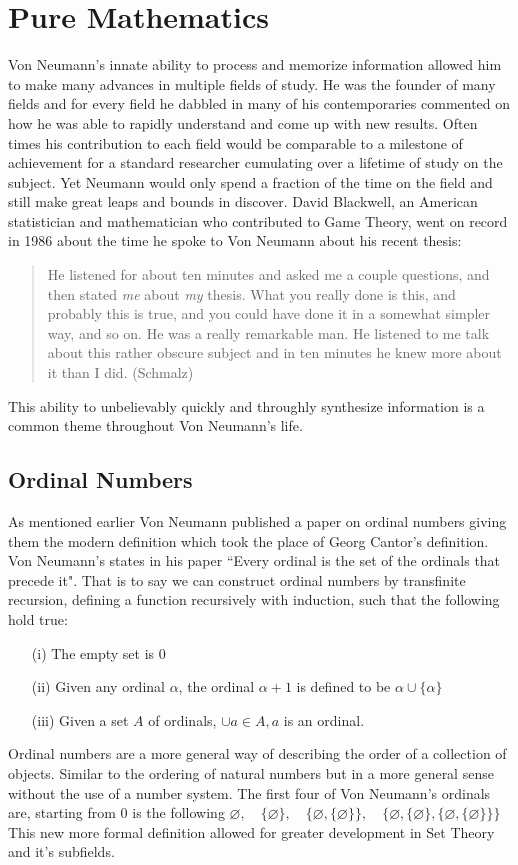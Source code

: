 \documentclass[12pt]{article}
\begin{document}
\section*{Pure Mathematics}
	Von Neumann's innate ability to process and memorize information allowed him to make many advances in multiple fields of study. He was the founder of many fields and for every field he dabbled in many of his contemporaries commented on how he was able to rapidly understand and come up with new results. Often times his contribution to each field would be comparable to a milestone of achievement for a standard researcher cumulating over a lifetime of study on the subject. Yet Neumann would only spend a fraction of the time on the field and still make great leaps and bounds in discover. David Blackwell, an American statistician and mathematician who contributed to Game Theory, went on record in 1986 about the time he spoke to Von Neumann about his recent thesis:
	\begin{quotation}
		He listened for about ten minutes and asked me a couple questions, and then stated \textit{me} about \textit{my} thesis. What you really done is this, and probably this is true, and you could have done it in a somewhat simpler way, and so on. He was a really remarkable man. He listened to me talk about this rather obscure subject and in ten minutes he knew more about it than I did. (Schmalz)
	\end{quotation}
  This ability to unbelievably quickly and throughly synthesize information is a common theme throughout Von Neumann's life. 
  
\subsection*{Ordinal Numbers}
	As mentioned earlier Von Neumann published a paper on ordinal numbers giving them the modern definition which took the place of Georg Cantor's definition. Von Neumann's states in his paper ``Every
	ordinal is the set of the ordinals that precede it". That is to say we can construct ordinal numbers by transfinite recursion, defining a function recursively with induction, such that the following hold true:\\
	\begin{enumerate}
		\item [(i)] The empty set is 0
		\item[(ii)] Given any ordinal $ \alpha $, the ordinal $ \alpha +1 $ is defined to be $ \alpha \cup \{\alpha\} $
		\item[(iii)] Given a set $ A $ of ordinals, $ \cup a\in A , a$ is an ordinal. 
	\end{enumerate}
	 Ordinal numbers are a more general way of describing the order of a collection of objects. Similar to the ordering of natural numbers but in a more general sense without the use of a number system. The first four of Von Neumann's ordinals are, starting from $ 0 $ is the following $ \varnothing,\quad \{\varnothing\}, \quad\{\varnothing,\{\varnothing\}\},\quad\{ \varnothing , \{ \varnothing \} , \{ \varnothing , \{ \varnothing \} \} \} $\\
	 This new more formal definition allowed for greater development in Set Theory and it's subfields.
\end{document}

